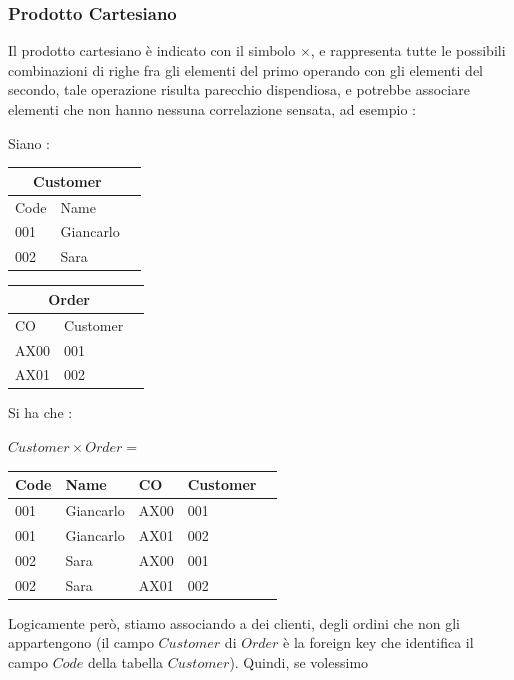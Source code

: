 \documentclass[12pt, letterpaper]{article}
\begin{document}
 \subsubsection{Prodotto Cartesiano}
 Il prodotto cartesiano è indicato con il simbolo \(\times\), e rappresenta tutte le possibili 
 combinazioni di righe fra gli elementi del primo operando con gli elementi del secondo, tale 
 operazione risulta parecchio dispendiosa, e potrebbe associare elementi che non hanno 
 nessuna correlazione sensata, ad esempio :
 \begin{center}
    Siano : 
    \begin{tabular}{|l|l|r|}
        \hline
    \multicolumn{2}{|c|}{\textbf{Customer}}\\
        \hline
        Code & Name  \\
        \hline
        001 & Giancarlo  \\
        \hline
        002 & Sara  \\
        \hline
        \end{tabular}
        \begin{tabular}{|l|l|r|}
            \hline
        \multicolumn{2}{|c|}{\textbf{Order}}\\
            \hline
            CO & Customer  \\
            \hline
            AX00 & 001  \\
            \hline
            AX01 & 002  \\
            \hline
            \end{tabular}
 Si ha che :\end{center}\begin{center}
    \(Customer\times Order =\)
    \begin{tabular}{|l|l|l|l|r|}
        \hline
        Code & Name & CO & Customer  \\
        \hline
        001 & Giancarlo & AX00 & 001 \\\hline
        001 & Giancarlo & AX01 & 002 \\\hline
        002 & Sara & AX00 & 001 \\\hline
        002 & Sara & AX01 & 002 \\
        \hline
        \end{tabular}
 \end{center}
 Logicamente però, stiamo associando a dei clienti, degli ordini che non gli appartengono (il campo \(Customer\) 
 di \(Order\) è la foreign key che identifica il campo \(Code\) della tabella \(Customer\)). Quindi, se volessimo 
\end{document}
